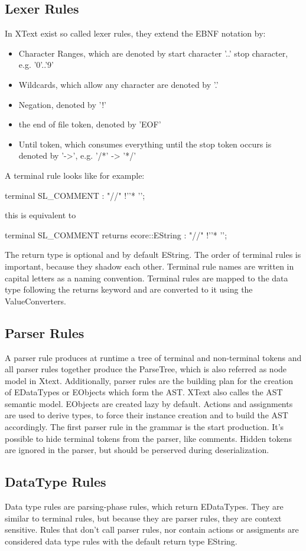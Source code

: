 \subsection{Lexer Rules}
In XText exist so called lexer rules,  they extend the EBNF notation by:
\begin{itemize}
	\item Character Ranges, which are denoted by start character '..' stop character, e.g. '0'..'9' 
	\item Wildcards, which allow any character are denoted by '.'
	\item Negation, denoted by '!'
	\item the end of file token, denoted by 'EOF'
	\item Until token, which consumes everything until the stop token occurs is denoted by '->', e.g. '/*' -> '*/'
\end{itemize}
A terminal rule looks like for example:
\begin{xtxt}
terminal SL_COMMENT : "//" !'\n'* '\n';
\end{xtxt}
this is equivalent to 
\begin{xtxt}
terminal SL_COMMENT returns ecore::EString : "//" !'\n'* '\n';
\end{xtxt}
The return type is optional and by default EString. The order of terminal rules is important, because they shadow each other. Terminal rule names are written in capital letters as a naming convention. Terminal rules are mapped to the data type following the returns keyword and are converted to it using the ValueConverters.

\subsection{Parser Rules}
A parser rule produces at runtime a tree of terminal and non-terminal tokens and all parser rules together produce the ParseTree, which is also referred as node model in Xtext. Additionally, parser rules are the building plan for the creation of EDataTypes or EObjects which form the AST. XText also calles the AST semantic model. EObjects are created lazy by default. Actions and assignments are used to derive types, to force their instance creation and to build the AST accordingly. The first parser rule in the grammar is the start production. It's possible to hide terminal tokens from the parser, like comments. Hidden tokens are ignored in the parser, but should be perserved during deserialization.

\subsection{DataType Rules}
Data type rules are parsing-phase rules, which return EDataTypes. They are similar to terminal rules, but because they are parser rules, they are context sensitive. Rules that don't call parser rules, nor contain actions or assigments are considered data type rules with the default return type EString. 
\begin{xtxt}
Number returns ecore::EInt : NUM ('.' NUM*)?;}
\end{xtxt}

